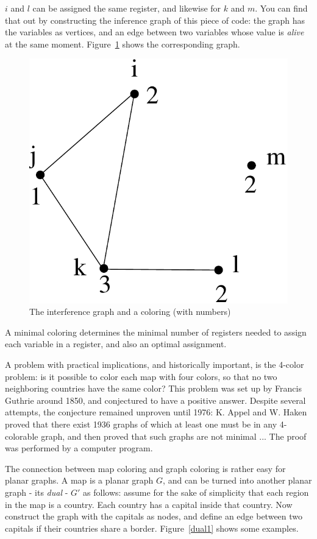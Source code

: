 \begin{itemize}
$i$ and $l$ can be assigned the same register, and likewise for $k$
and $m$. You can find that out by constructing the inference graph of
this piece of code: the graph has the variables as vertices, and an
edge between two variables whose value is {\em alive} at the same
moment. Figure~\ref{regalloc1} shows the corresponding graph.

\begin{figure}[ht]
\begin{center}
\includegraphics[width=0.2\linewidth,keepaspectratio]{regalloc1}
\end{center}
\caption{The interference graph and a coloring (with numbers) \label{regalloc1}}
\end{figure}

A minimal coloring determines the minimal number of registers needed
to assign each variable in a register, and also an optimal assignment.

\end{itemize}

A problem with practical implications, and historically important, is
the 4-color problem: is it possible to color each map with four
colors, so that no two neighboring countries have the same color? This
problem was set up by Francis Guthrie around 1850, and conjectured to
have a positive answer. Despite several attempts, the conjecture
remained unproven until 1976: K. Appel and W. Haken proved that there
exist 1936 graphs of which at least one must be in any 4-colorable
graph, and then proved that such graphs are not minimal ... The proof
was performed by a computer program.

The connection between map coloring and graph coloring is rather easy
for planar graphs. A map is a planar graph $G$, and can be turned into
another planar graph - its {\em dual} - $G'$ as follows: assume for
the sake of simplicity that each region in the map is a country. Each
country has a capital inside that country. Now construct the graph
with the capitals as nodes, and define an edge between two capitals if
their countries share a border. Figure~\ref{dual1} shows some
examples.


